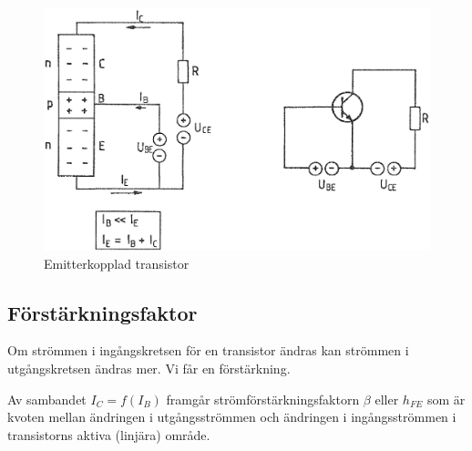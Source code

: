 \begin{figure}
\includegraphics[width=.8\textwidth]{images/cropped_pdfs/bild_2_2-18.pdf}
\caption{Emitterkopplad transistor}
\label{fig:BildII2-18}
\end{figure}

\subsection{Förstärkningsfaktor}

Om strömmen i ingångskretsen för en transistor ändras kan strömmen i
utgångskretsen ändras mer. Vi får en förstärkning.

Av sambandet \(I_C = f(I_B)\) framgår strömförstärkningsfaktorn
\(\beta\) eller \(h_{FE}\) som är kvoten mellan ändringen i
utgångsströmmen och ändringen i ingångsströmmen i transistorns aktiva
(linjära) område.

